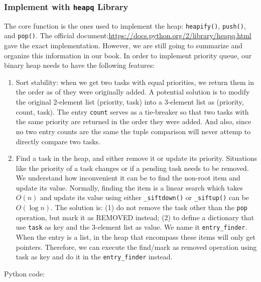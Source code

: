 \documentclass[main.tex]{subfiles}
\begin{document}
\subsubsection{Implement with \texttt{heapq}  Library} The core function is the ones used to implement the heap: \texttt{heapify()}, \texttt{push()}, and \texttt{pop()}. The official document:\url{https://docs.python.org/2/library/heapq.html} gave the exact implementation. However, we are still going to summarize and organize this information in our book. In order to implement priority queue, our binary heap needs to have the following features:
\begin{enumerate}
    \item Sort stability: when we get two tasks with equal priorities, we return them in the order as of they were originally added. A potential solution is to modify the original 2-element list (priority, task) into a 3-element list as (priority, count, task). The entry \texttt{count} serves as a tie-breaker so that two tasks with the same priority are returned in the order they were added. And also, since no two entry counts are the same the tuple comparison will never attemp to directly compare two tasks.
    \item Find a task in the heap, and either remove it or update its priority. Situations like the priority of a task changes or if a pending task needs to be removed. We understand how inconvenient it can be to find the non-root item and update its value. Normally, finding the item is a linear search which takes $O(n)$ and update its value using either \texttt{\_siftdown()} or \texttt{\_siftup()} can be $O(\log n)$. The solution is: (1) do not remove the task other than the \texttt{pop} operation, but mark it as REMOVED instead; (2) to define a dictionary that use \texttt{task} as key and the 3-element list as value. We name it \texttt{entry\_finder}. When the entry is a list, in the heap that encompass these items will only get pointers. Therefore, we can execute the find/mark as removed operation using task as key and do it in the \texttt{entry\_finder} instead.
\end{enumerate}
Python code:
\end{document}
